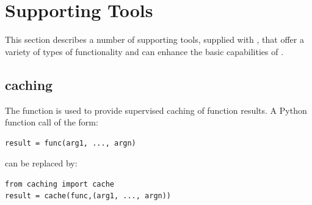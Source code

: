 \documentclass{manual}
\begin{document}
%
%
%
%
%
%
%
%
%


\appendix


\chapter{Supporting Tools}
\label{ch:supportingtools}

This section describes a number of supporting tools, supplied with \anuga, that offer a
variety of types of functionality and can enhance the basic capabilities of \anuga.


\section{caching}
\label{sec:caching}

The  function is used to provide supervised caching of function
results. A Python function call of the form:

\begin{verbatim}
result = func(arg1, ..., argn)
\end{verbatim}

can be replaced by:

\begin{verbatim}
from caching import cache
result = cache(func,(arg1, ..., argn))
\end{verbatim}
\end{document}
